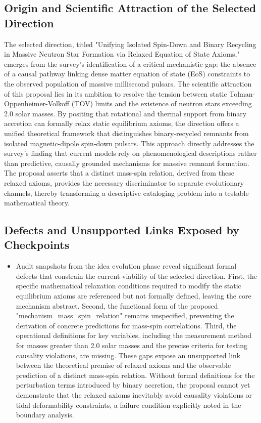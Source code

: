 \documentclass[conference]{IEEEtran}
\begin{document}
\subsection{Origin and Scientific Attraction of the Selected Direction}
The selected direction, titled "Unifying Isolated Spin-Down and Binary Recycling in Massive Neutron Star Formation via Relaxed Equation of State Axioms," emerges from the survey's identification of a critical mechanistic gap: the absence of a causal pathway linking dense matter equation of state (EoS) constraints to the observed population of massive millisecond pulsars. The scientific attraction of this proposal lies in its ambition to resolve the tension between static Tolman-Oppenheimer-Volkoff (TOV) limits and the existence of neutron stars exceeding 2.0 solar masses. By positing that rotational and thermal support from binary accretion can formally relax static equilibrium axioms, the direction offers a unified theoretical framework that distinguishes binary-recycled remnants from isolated magnetic-dipole spin-down pulsars. This approach directly addresses the survey's finding that current models rely on phenomenological descriptions rather than predictive, causally grounded mechanisms for massive remnant formation. The proposal asserts that a distinct mass-spin relation, derived from these relaxed axioms, provides the necessary discriminator to separate evolutionary channels, thereby transforming a descriptive cataloging problem into a testable mathematical theory.~\cite{cite_42e341ff6471ce89,cite_a50fdc75b0400b49}

\subsection{Defects and Unsupported Links Exposed by Checkpoints}
\begin{itemize}
\item Audit snapshots from the idea evolution phase reveal significant formal defects that constrain the current viability of the selected direction. First, the specific mathematical relaxation conditions required to modify the static equilibrium axioms are referenced but not formally defined, leaving the core mechanism abstract. Second, the functional form of the proposed "mechanism\_mass\_spin\_relation" remains unspecified, preventing the derivation of concrete predictions for mass-spin correlations. Third, the operational definitions for key variables, including the measurement method for masses greater than 2.0 solar masses and the precise criteria for testing causality violations, are missing. These gaps expose an unsupported link between the theoretical premise of relaxed axioms and the observable prediction of a distinct mass-spin relation. Without formal definitions for the perturbation terms introduced by binary accretion, the proposal cannot yet demonstrate that the relaxed axioms inevitably avoid causality violations or tidal deformability constraints, a failure condition explicitly noted in the boundary analysis.
\end{itemize}
\end{document}
